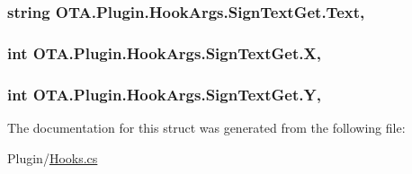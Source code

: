 \subsubsection[{Text}]{\setlength{\rightskip}{0pt plus 5cm}string O\+T\+A.\+Plugin.\+Hook\+Args.\+Sign\+Text\+Get.\+Text\hspace{0.3cm}{\ttfamily [get]}, {\ttfamily [set]}}\label{struct_o_t_a_1_1_plugin_1_1_hook_args_1_1_sign_text_get_a85ac6ed7cb76de53440f96634a8873f1}
\hypertarget{struct_o_t_a_1_1_plugin_1_1_hook_args_1_1_sign_text_get_a729fa7d71a41ccfc04b55a47fe8c58b8}{}
\subsubsection[{X}]{\setlength{\rightskip}{0pt plus 5cm}int O\+T\+A.\+Plugin.\+Hook\+Args.\+Sign\+Text\+Get.\+X\hspace{0.3cm}{\ttfamily [get]}, {\ttfamily [set]}}\label{struct_o_t_a_1_1_plugin_1_1_hook_args_1_1_sign_text_get_a729fa7d71a41ccfc04b55a47fe8c58b8}
\hypertarget{struct_o_t_a_1_1_plugin_1_1_hook_args_1_1_sign_text_get_addf1eff9571d76f3b4581c035ff37994}{}
\subsubsection[{Y}]{\setlength{\rightskip}{0pt plus 5cm}int O\+T\+A.\+Plugin.\+Hook\+Args.\+Sign\+Text\+Get.\+Y\hspace{0.3cm}{\ttfamily [get]}, {\ttfamily [set]}}\label{struct_o_t_a_1_1_plugin_1_1_hook_args_1_1_sign_text_get_addf1eff9571d76f3b4581c035ff37994}


The documentation for this struct was generated from the following file\+:\begin{DoxyCompactItemize}
\item 
Plugin/\hyperlink{_hooks_8cs}{Hooks.\+cs}\end{DoxyCompactItemize}
